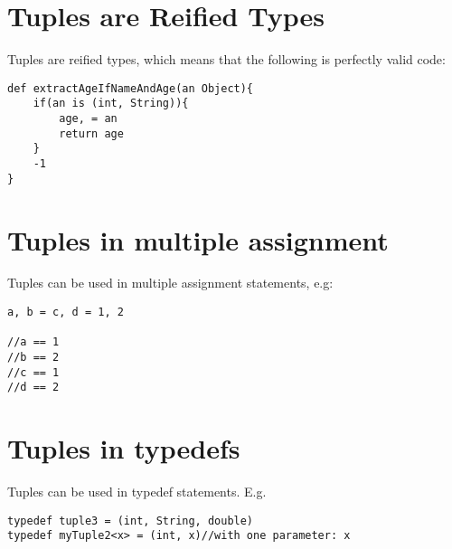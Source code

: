 \documentclass[conc-doc]{subfiles}
\begin{document}
\section{Tuples are Reified Types}
Tuples are reified types, which means that the following is perfectly valid code:
\begin{lstlisting}
def extractAgeIfNameAndAge(an Object){
	if(an is (int, String)){
		age, = an
		return age
	}
	-1
}
\end{lstlisting}

\section{Tuples in multiple assignment}
Tuples can be used in multiple assignment statements, e.g:
\begin{lstlisting}
a, b = c, d = 1, 2

//a == 1
//b == 2
//c == 1
//d == 2
\end{lstlisting}

\section{Tuples in typedefs}
Tuples can be used in typedef statements. E.g.
\begin{lstlisting}
typedef tuple3 = (int, String, double)
typedef myTuple2<x> = (int, x)//with one parameter: x
\end{lstlisting}
\end{document}
